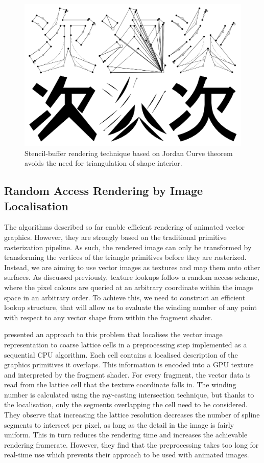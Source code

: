 \documentclass[11pt,a4paper,twoside]{article}
\begin{document}
\begin {figure}
	\centering
	\includegraphics [width=0.5\columnwidth] {figures/kokojima}
	\caption {Stencil-buffer rendering technique based on Jordan Curve theorem avoids the need for triangulation of shape interior.}
	\label {fig:kokojima}
\end {figure}

\subsection {Random Access Rendering by Image Localisation}

The algorithms described so far enable efficient rendering of animated vector graphics. However, they are strongly based on the traditional primitive rasterization pipeline. As such, the rendered image can only be transformed by transforming the vertices of the triangle primitives before they are rasterized. Instead, we are aiming to use vector images as textures and map them onto other surfaces. As discussed previously, texture lookups follow a random access scheme, where the pixel colours are queried at an arbitrary coordinate within the image space in an arbitrary order. To achieve this, we need to construct an efficient lookup structure, that will allow us to evaluate the winding number of any point with respect to any vector shape from within the fragment shader.

\cite{NehabHoppe08} presented an approach to this problem that localises the vector image representation to coarse lattice cells in a preprocessing step implemented as a sequential CPU algorithm. Each cell contains a localised description of the graphics primitives it overlaps. This information is encoded into a GPU texture and interpreted by the fragment shader. For every fragment, the vector data is read from the lattice cell that the texture coordinate falls in. The winding number is calculated using the ray-casting intersection technique, but thanks to the localisation, only the segments overlapping the cell need to be considered. They observe that increasing the lattice resolution decreases the number of spline segments to intersect per pixel, as long as the detail in the image is fairly uniform. This in turn reduces the rendering time and increases the achievable rendering framerate. However, they find that the preprocessing takes too long for real-time use which prevents their approach to be used with animated images.
\end{document}
